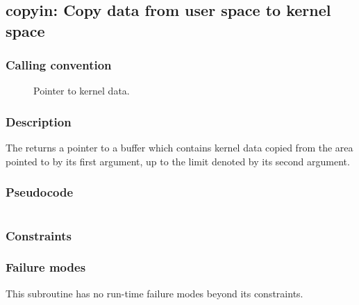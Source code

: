 \clearpage
{}
{}
\label{insn:dummy}
\subsection*{copyin: Copy data from user space to kernel space}

\subsubsection*{Calling convention}

\begin{description}
\item[] Pointer to kernel data.
\end{description}

\subsubsection*{Description}

The  returns a pointer to a buffer which contains
kernel data copied from the area pointed to by its first argument, up
to the limit denoted by its second argument.
\subsubsection*{Pseudocode}

\begin{verbatim}
\end{verbatim}

\subsubsection*{Constraints}

\subsubsection*{Failure modes}

This subroutine has no run-time failure modes beyond its constraints.
